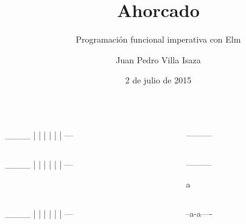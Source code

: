 \documentclass[spanish]{beamer}
\title{Ahorcado}
\subtitle{Programación funcional imperativa con Elm}
\author{Juan Pedro Villa Isaza}
\institute{Stack Builders}
\date{2 de julio de 2015}
\begin{document}

\frame{\titlepage}


\begin{frame}[fragile]
  \begin{columns}[onlytextwidth,T]
    \begin{column}{.5\textwidth}
      \begin{code}
  ____
  |  |
  |
  |
  |
  |
 ---
      \end{code}
    \end{column}
    \begin{column}{.5\textwidth}
      \begin{code}


 ---------




      \end{code}
    \end{column}
  \end{columns}
\end{frame}


\begin{frame}[fragile]
  \begin{columns}[onlytextwidth,T]
    \begin{column}{.5\textwidth}
      \begin{code}
  ____
  |  |
  |
  |
  |
  |
 ---
      \end{code}
    \end{column}
    \begin{column}{.5\textwidth}
      \begin{code}


 ---------

 a


      \end{code}
    \end{column}
  \end{columns}
\end{frame}


\begin{frame}[fragile]
  \begin{columns}[onlytextwidth,T]
    \begin{column}{.5\textwidth}
      \begin{code}
  ____
  |  |
  |
  |
  |
  |
 ---
      \end{code}
    \end{column}
    \begin{column}{.5\textwidth}
      \begin{code}


 --a-a----




      \end{code}
    \end{column}
  \end{columns}
\end{frame}
\end{document}
